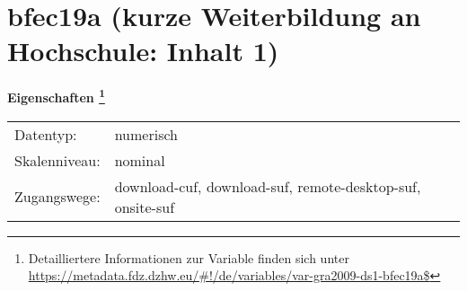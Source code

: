 
    \setcounter{footnote}{0}

    \vspace*{-1.8cm}
	\section{bfec19a (kurze Weiterbildung an Hochschule: Inhalt 1)}
	\label{section:bfec19a}



    \vspace*{0.5cm}
    \noindent\textbf{Eigenschaften
	\footnote{Detailliertere Informationen zur Variable finden sich unter
		\url{https://metadata.fdz.dzhw.eu/\#!/de/variables/var-gra2009-ds1-bfec19a$}}}\\
	\begin{tabularx}{\hsize}{@{}lX}
	Datentyp: & numerisch \\
	Skalenniveau: & nominal \\
	Zugangswege: &
	  download-cuf, 
	  download-suf, 
	  remote-desktop-suf, 
	  onsite-suf
 \\
    \end{tabularx}



